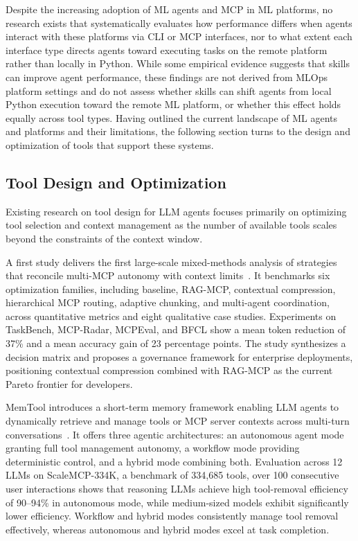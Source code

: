 \documentclass[
english,                 %
bibtex,                  %
includeExtraAbstracts, %
]{kththesis}
\numberwithin{listing}{chapter}
\begin{document}
Despite the increasing adoption of \gls{ML} agents and \gls{MCP} in \gls{ML} platforms, no research exists that systematically evaluates how performance differs when agents interact with these platforms via \gls{CLI} or \gls{MCP} interfaces, nor to what extent each interface type directs agents toward executing tasks on the remote platform rather than locally in Python. While some empirical evidence suggests that skills can improve agent performance, these findings are not derived from \gls{MLOps} platform settings and do not assess whether skills can shift agents from local Python execution toward the remote \gls{ML} platform, or whether this effect holds equally across tool types. 
Having outlined the current landscape of \gls{ML} agents and platforms and their limitations, the following section turns to the design and optimization of tools that support these systems.

\subsection{Tool Design and Optimization}

Existing research on tool design for \gls{LLM} agents focuses primarily on optimizing tool selection and context management as the number of available tools scales beyond the constraints of the context window.

A first study delivers the first large-scale mixed-methods analysis of strategies that reconcile multi-\gls{MCP} autonomy with context limits~\cite{v_scaling_2025}. It benchmarks six optimization families, including baseline, \gls{RAG}-\gls{MCP}, contextual compression, hierarchical \gls{MCP} routing, adaptive chunking, and multi-agent coordination, across quantitative metrics and eight qualitative case studies. Experiments on TaskBench, \gls{MCP}-Radar, \gls{MCP}Eval, and \gls{BFCL} show a mean token reduction of 37\% and a mean accuracy gain of 23 percentage points. The study synthesizes a decision matrix and proposes a governance framework for enterprise deployments, positioning contextual compression combined with \gls{RAG}-\gls{MCP} as the current Pareto frontier for developers.

MemTool introduces a short-term memory framework enabling \gls{LLM} agents to dynamically retrieve and manage tools or \gls{MCP} server contexts across multi-turn conversations~\cite{campos_memtool_2026}. It offers three agentic architectures: an autonomous agent mode granting full tool management autonomy, a workflow mode providing deterministic control, and a hybrid mode combining both. Evaluation across 12 \glspl{LLM} on Scale\gls{MCP}-334K, a benchmark of 334,685 tools, over 100 consecutive user interactions shows that reasoning \glspl{LLM} achieve high tool-removal efficiency of 90--94\% in autonomous mode, while medium-sized models exhibit significantly lower efficiency. Workflow and hybrid modes consistently manage tool removal effectively, whereas autonomous and hybrid modes excel at task completion.
\end{document}
